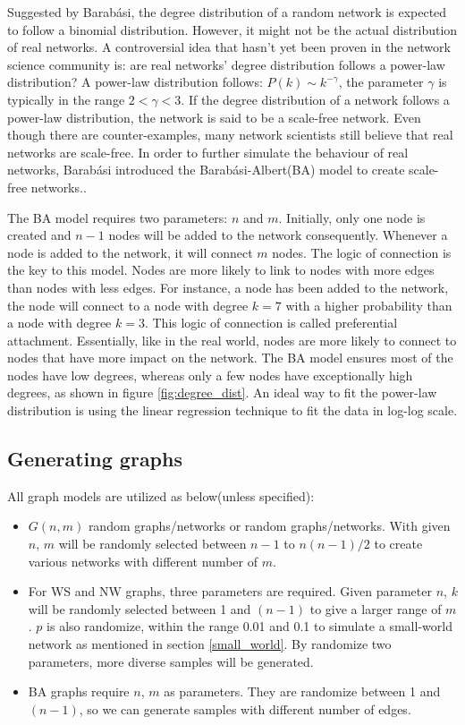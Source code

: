 \documentclass[12pt]{article}
\begin{document}
Suggested by Barabási\cite{barabási2016network}, the degree distribution of a random network is expected to follow a binomial distribution. However, it might not be the actual distribution of real networks. A controversial idea that hasn't yet been proven in the network science community is: are real networks' degree distribution follows a power-law distribution? A power-law distribution follows: $P(k) \sim k^{-\gamma }$, the parameter $\gamma$ is typically in the range $2<\gamma<3$. If the degree distribution of a network follows a power-law distribution, the network is said to be a scale-free network. Even though there are counter-examples\cite{broido_clauset_2019}, many network scientists still believe that real networks are scale-free\cite{albert1999diameter}. In order to further simulate the behaviour of real networks, Barabási introduced the Barabási-Albert(BA) model to create scale-free networks.\cite{barabási2016network}.\par
The BA model requires two parameters: $n$ and $m$. Initially, only one node is created and $n-1$ nodes will be added to the network consequently. Whenever a node is added to the network, it will connect $m$ nodes. The logic of connection is the key to this model. Nodes are more likely to link to nodes with more edges than nodes with less edges. For instance, a node has been added to the network, the node will connect to a node with degree $k=7$ with a higher probability than a node with degree $k=3$. This logic of connection is called preferential attachment. Essentially, like in the real world, nodes are more likely to connect to nodes that have more impact on the network.\cite{pa_test} The BA model ensures most of the nodes have low degrees, whereas only a few nodes have exceptionally high degrees, as shown in figure \ref{fig:degree_dist}. An ideal way to fit the power-law distribution is using the linear regression technique to fit the data in log-log scale.

\subsection{Generating graphs}
\label{generate_graphs}
All graph models are utilized as below(unless specified):
\begin{itemize}
    \item $G(n,m)$ random graphs/networks or random graphs/networks. With given $n$, $m$ will be randomly selected between $n-1$ to $n(n-1)/2$ to create various networks with different number of $m$.
    \item For WS and NW graphs, three parameters are required. Given parameter $n$, $k$ will be randomly selected between 1 and $(n-1)$ to give a larger range of $m$. $p$ is also randomize, within the range 0.01 and 0.1 to simulate a small-world network as mentioned in section \ref{small_world}. By randomize two parameters, more diverse samples will be generated.
    \item BA graphs require $n$, $m$ as parameters. They are randomize between 1 and $(n-1)$, so we can generate samples with different number of edges.
\end{itemize}
\end{document}
